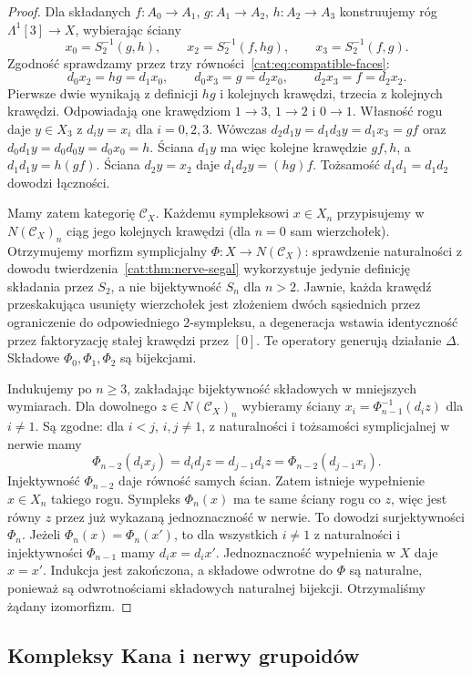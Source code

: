 \begin{proof}
Dla składanych $f:A_0\to A_1$, $g:A_1\to A_2$, $h:A_2\to A_3$ konstruujemy róg $\Lambda^1[3]\to X$, wybierając ściany
\[
 x_0=S_2^{-1}(g,h),\qquad
 x_2=S_2^{-1}(f,hg),\qquad
 x_3=S_2^{-1}(f,g).
\]
Zgodność sprawdzamy przez trzy równości~\eqref{cat:eq:compatible-faces}:
\[
 d_0x_2=hg=d_1x_0,\qquad
 d_0x_3=g=d_2x_0,\qquad
 d_2x_3=f=d_2x_2.
\]
Pierwsze dwie wynikają z definicji $hg$ i kolejnych krawędzi, trzecia z kolejnych krawędzi. Odpowiadają one krawędziom $1\to3$, $1\to2$ i $0\to1$. Własność rogu daje $y\in X_3$ z $d_i y=x_i$ dla $i=0,2,3$. Wówczas $d_2d_1y=d_1d_3y=d_1x_3=gf$ oraz $d_0d_1y=d_0d_0y=d_0x_0=h$. Ściana $d_1y$ ma więc kolejne krawędzie $gf,h$, a $d_1d_1y=h(gf)$. Ściana $d_2y=x_2$ daje $d_1d_2y=(hg)f$. Tożsamość $d_1d_1=d_1d_2$ dowodzi łączności.

Mamy zatem kategorię $\mathcal C_X$. Każdemu sympleksowi $x\in X_n$ przypisujemy w $N(\mathcal C_X)_n$ ciąg jego kolejnych krawędzi (dla $n=0$ sam wierzchołek). Otrzymujemy morfizm symplicjalny $\Phi:X\to N(\mathcal C_X)$: sprawdzenie naturalności z dowodu twierdzenia~\ref{cat:thm:nerve-segal} wykorzystuje jedynie definicję składania przez $S_2$, a nie bijektywność $S_n$ dla $n>2$. Jawnie, każda krawędź przeskakująca usunięty wierzchołek jest złożeniem dwóch sąsiednich przez ograniczenie do odpowiedniego $2$-sympleksu, a degeneracja wstawia identyczność przez faktoryzację stałej krawędzi przez $[0]$. Te operatory generują działanie $\Delta$. Składowe $\Phi_0,\Phi_1,\Phi_2$ są bijekcjami.

Indukujemy po $n\geq3$, zakładając bijektywność składowych w mniejszych wymiarach. Dla dowolnego $z\in N(\mathcal C_X)_n$ wybieramy ściany $x_i=\Phi_{n-1}^{-1}(d_i z)$ dla $i\ne1$. Są zgodne: dla $i<j$, $i,j\ne1$, z naturalności i tożsamości symplicjalnej w nerwie mamy
\[
 \Phi_{n-2}(d_i x_j)=d_i d_j z
 =d_{j-1}d_i z=\Phi_{n-2}(d_{j-1}x_i).
\]
Injektywność $\Phi_{n-2}$ daje równość samych ścian. Zatem istnieje wypełnienie $x\in X_n$ takiego rogu. Sympleks $\Phi_n(x)$ ma te same ściany rogu co $z$, więc jest równy $z$ przez już wykazaną jednoznaczność w nerwie. To dowodzi surjektywności $\Phi_n$. Jeżeli $\Phi_n(x)=\Phi_n(x')$, to dla wszystkich $i\ne1$ z naturalności i injektywności $\Phi_{n-1}$ mamy $d_i x=d_i x'$. Jednoznaczność wypełnienia w $X$ daje $x=x'$. Indukcja jest zakończona, a składowe odwrotne do $\Phi$ są naturalne, ponieważ są odwrotnościami składowych naturalnej bijekcji. Otrzymaliśmy żądany izomorfizm.
\end{proof}

\subsection{Kompleksy Kana i nerwy grupoidów}

